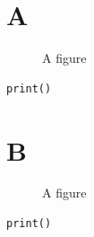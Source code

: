 \documentclass{report}
\begin{document}
\listoffigures
\listoftables
\lstlistoflistings

\chapter{A}
\begin{figure}\caption{A figure}\end{figure}
\begin{table}\caption{A table}\end{table}
\begin{lstlisting}[caption=Some caption]
print()
\end{lstlisting}

\chapter{B}
\begin{figure}\caption{A figure}\end{figure}
\begin{table}\caption{A table}\end{table}
\begin{lstlisting}[caption=Some caption]
print()
\end{lstlisting}
\end{document}
